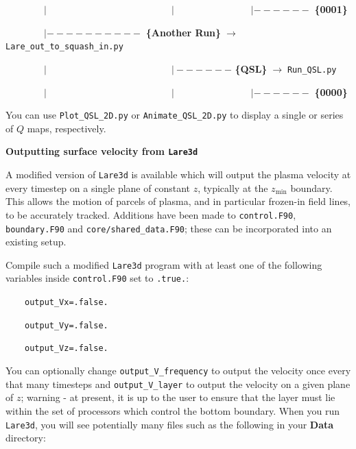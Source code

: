 \documentclass[12pt,twoside]{article}
\begin{document}
$\quad\quad\quad\quad | \quad\quad\quad\quad\quad\quad\quad\quad\quad\quad\quad\quad\quad | \quad\quad\quad\quad\quad\quad\quad\quad | ------ $ \textbf{\{0001\}}

$\quad\quad\quad\quad | ---------- $ \textbf{\{Another Run\}}$\;\rightarrow\;$\texttt{Lare\_out\_to\_squash\_in.py}

$\quad\quad\quad\quad | \quad\quad\quad\quad\quad\quad\quad\quad\quad\quad\quad\quad\quad | ------ $ \textbf{\{QSL\}}$\;\rightarrow\;$\texttt{Run\_QSL.py}

$\quad\quad\quad\quad | \quad\quad\quad\quad\quad\quad\quad\quad\quad\quad\quad\quad\quad | \quad\quad\quad\quad\quad\quad\quad\quad | ------ $ \textbf{\{0000\}}

\vspace{4mm}

You can use \texttt{Plot\_QSL\_2D.py} or \texttt{Animate\_QSL\_2D.py} to display a single or series of $Q$ maps, respectively.


\vspace{8mm}
{\large \textbf{Outputting surface velocity from \texttt{Lare3d}}}

A modified version of \texttt{Lare3d} is available which will output the plasma velocity at every timestep on a single plane of constant $z$, typically at the $z_{\mathrm{min}}$ boundary. This allows the motion of parcels of plasma, and in particular frozen-in field lines, to be accurately tracked. Additions have been made to \texttt{control.F90}, \texttt{boundary.F90} and \texttt{core/shared\_data.F90}; these can be incorporated into an existing setup.

Compile such a modified \texttt{Lare3d} program with at least one of the following variables inside \texttt{control.F90} set to \texttt{.true.}:

$\quad\quad$\texttt{output\_Vx=.false.}

$\quad\quad$\texttt{output\_Vy=.false.}

$\quad\quad$\texttt{output\_Vz=.false.}

You can optionally change \texttt{output\_V\_frequency} to output the velocity once every that many timesteps and \texttt{output\_V\_layer} to output the velocity on a given plane of $z$; warning - at present, it is up to the user to ensure that the layer must lie within the set of processors which control the bottom boundary. When you run \texttt{Lare3d}, you will see potentially many files such as the following in your \textbf{Data} directory:
\end{document}
